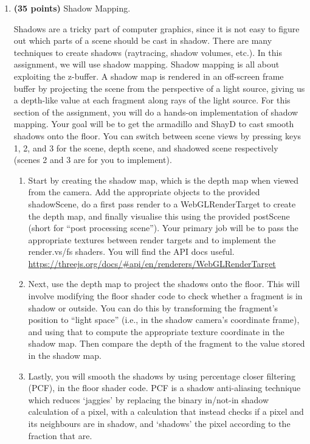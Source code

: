 \documentclass[12pt]{exam}
\begin{document}
\begin{enumerate}
\begin{enumerate}
\item {\bf (35 points)} Shadow Mapping.

Shadows are a tricky part of computer graphics, since it is not easy to figure out
which parts of a scene should be cast in shadow. There are many techniques to
create shadows (raytracing, shadow volumes, etc.). In this assignment, we will use
shadow mapping. Shadow mapping is all about exploiting the z-buffer. A shadow
map is rendered in an off-screen frame buffer by projecting the scene from the
perspective of a light source, giving us a depth-like value at each fragment along
rays of the light source.
For this section of the assignment, you will do a hands-on implementation of
shadow mapping. Your goal will be to get the armadillo and ShayD to cast smooth
shadows onto the floor. You can switch between scene views by pressing keys 1, 2, and
3 for the scene, depth scene, and shadowed scene respectively (scenes 2 and 3 are for
you to implement).

\begin{enumerate}
\item Start by creating the shadow map, which is the depth map when viewed from the camera. Add the appropriate objects to the provided shadowScene, do a first pass render to a WebGLRenderTarget to create the depth map, and finally visualise this using the provided postScene (short for ``post processing scene''). Your primary job will be to pass the appropriate textures between render targets and to implement the render.vs/fs shaders. You will find the API docs useful.
\newline
\url{https://threejs.org/docs/#api/en/renderers/WebGLRenderTarget}
    \item Next, use the depth map to project the shadows onto the floor. This will involve modifying the floor shader code to check whether a fragment is in shadow or outside. You can do this by transforming the fragment's position to ``light space'' (i.e., in the shadow camera's coordinate frame), and using that to compute the appropriate texture coordinate in the shadow map. Then compare the depth of the fragment to the value stored in the shadow map.
    \item Lastly, you will smooth the shadows by using percentage closer filtering (PCF), in
the floor shader code. PCF is a shadow anti-aliasing technique which reduces `jaggies'
by replacing the binary in/not-in shadow calculation of a pixel, with a calculation that
instead checks if a pixel and its neighbours are in shadow, and `shadows' the pixel
according to the fraction that are.


\end{enumerate}
\end{enumerate}
\end{enumerate}
\end{document}
